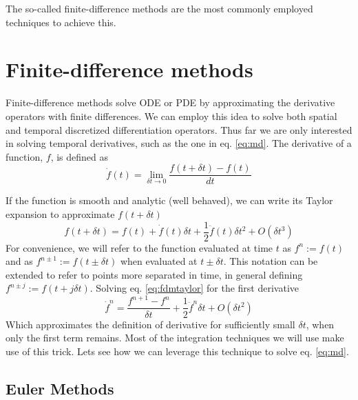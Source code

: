\documentclass[ twoside,openright,titlepage,numbers=noenddot,%
headinclude,footinclude,cleardoublepage=empty,abstract=on,
BCOR=5mm,paper=a4,fontsize=11pt, dvipsnames
]{scrreprt}
\newcommand{\dt}{\delta t}
\newcommand{\half}{\frac{1}{2}}
\begin{document}
The so-called finite-difference methods are the most commonly employed techniques to achieve this.
\section{Finite-difference methods}
Finite-difference methods\cite{fdm} solve \gls{ODE} or \gls{PDE} by approximating the derivative operators with finite differences.
We can employ this idea to solve both spatial and temporal discretized differentiation operators. Thus far we are only interested in solving temporal derivatives, such as the one in eq. \eqref{eq:md}.
The derivative of a function, $f$, is defined as
\begin{equation}
  \dot{f}(t) = \lim_{\dt\rightarrow 0} \frac{f(t+\dt) - f(t)}{dt}
\end{equation}

If the function is smooth and analytic (well behaved), we can write its Taylor expansion to approximate $f(t+\dt)$
\begin{equation}
  \label{eq:fdmtaylor}
  f(t+\dt) = f(t)+\dot{f}(t)\dt + \half\ddot{f}(t)\dt^2 + O(\dt^3)
\end{equation}
For convenience, we will refer to the function evaluated at time $t$ as $f^n := f(t)$ and as $f^{n\pm 1} := f(t\pm \dt)$ when evaluated at $t\pm \dt$. This notation can be extended to refer to points more separated in time, in general defining $f^{n\pm j} := f(t+j\dt)$.
Solving eq. \eqref{eq:fdmtaylor} for the first derivative
\begin{equation}
 \dot{f}^n  =  \frac{f^{n+1} - f^n}{\dt} + \half\ddot{f}^n\dt + O(\dt^2)
\end{equation}
Which approximates the definition of derivative for sufficiently small $\dt$, when only the first term remains.
Most of the integration techniques we will use make use of this trick.
Lets see how we can leverage this technique to solve eq. \eqref{eq:md}.
\subsection{Euler Methods}\label{sec:euler}
\end{document}
